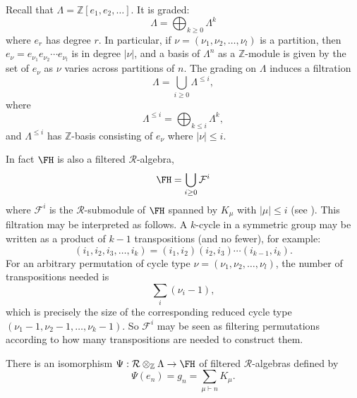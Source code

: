 Recall that $\Lambda = \mathbb{Z}[e_1, e_2, \ldots]$. It is graded:
\[
\Lambda = \bigoplus_{k \geq 0} \Lambda^k
\]
where $e_r$ has degree $r$. In particular, if $\nu = (\nu_1, \nu_2, \ldots, \nu_l)$ is a partition, then $e_\nu = e_{\nu_1} e_{\nu_2} \cdots e_{\nu_l}$ is in degree $|\nu|$, and a basis of $\Lambda^n$ as a $\mathbb{Z}$-module is given by the set of $e_\nu$ as $\nu$ varies across partitions of $n$. The grading on $\Lambda$ induces a filtration 
\[
\Lambda = \bigcup_{i \geq 0} \Lambda^{\leq i},
\]
where
\[
\Lambda^{\leq i} = \bigoplus_{k \leq i} \Lambda^k,
\]
and $\Lambda^{\leq i}$ has $\mathbb{Z}$-basis consisting of $e_\nu$ where $|\nu| \leq i$.

In fact $\FH$ is also a filtered $\mathcal{R}$-algebra,
\[
\FH = \bigcup_{i \geq 0} \mathcal{F}^i
\]
where $\mathcal{F}^i$ is the $\mathcal{R}$-submodule of $\FH$ spanned by $K_\mu$ with $|\mu| \leq i$ (see  \cite[Lemma 3.9]{FarahatHigman}). This filtration may be interpreted as follows. A $k$-cycle in a symmetric group may be written as a product of $k-1$ transpositions (and no fewer), for example:
\[
(i_1, i_2, i_3, \ldots, i_k) = (i_1, i_2)(i_2, i_3)\cdots(i_{k-1},i_k).
\]
For an arbitrary permutation of cycle type $\nu = (\nu_1, \nu_2, \ldots, \nu_l)$, the number of transpositions needed is
\[
\sum_i (\nu_i - 1),
\]
which is precisely the size of the corresponding reduced cycle type $(\nu_1-1, \nu_2-1, \ldots, \nu_k-1)$. So $\mathcal{F}^i$ may be seen as filtering permutations according to how many transpositions are needed to construct them.

\begin{theorem} \label{thm:FH_lambda_iso}
There is an isomorphism $\Psi: \mathcal{R} \otimes_{\mathbb{Z}} \Lambda \to \FH$ of filtered $\mathcal{R}$-algebras defined by
\[
\Psi(e_n) = g_n = \sum_{\mu \vdash n} K_\mu.
\]
\end{theorem}

